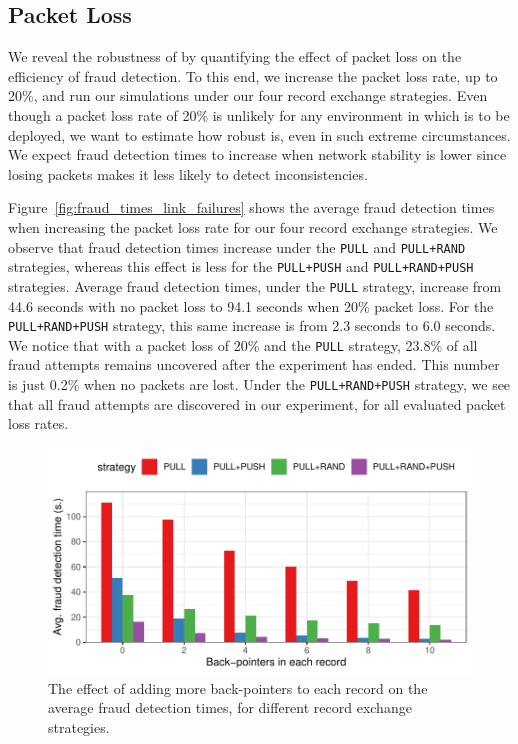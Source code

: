 \subsection{Packet Loss}
We reveal the robustness of \TrustChain{} by quantifying the effect of packet loss on the efficiency of fraud detection.
To this end, we increase the packet loss rate, up to 20\%, and run our simulations under our four record exchange strategies.
Even though a packet loss rate of 20\% is unlikely for any environment in which \TrustChain{} is to be deployed, we want to estimate how robust \TrustChain{} is, even in such extreme circumstances.
We expect fraud detection times to increase when network stability is lower since losing packets makes it less likely to detect inconsistencies.

Figure~\ref{fig:fraud_times_link_failures} shows the average fraud detection times when increasing the packet loss rate for our four record exchange strategies.
We observe that fraud detection times increase under the \texttt{PULL} and \texttt{PULL+RAND} strategies, whereas this effect is less for the \texttt{PULL+PUSH} and \texttt{PULL+RAND+PUSH} strategies.
Average fraud detection times, under the \texttt{PULL} strategy, increase from 44.6 seconds with no packet loss to 94.1 seconds when 20\% packet loss.
For the \texttt{PULL+RAND+PUSH} strategy, this same increase is from 2.3 seconds to 6.0 seconds.
We notice that with a packet loss of 20\% and the \texttt{PULL} strategy, 23.8\% of all fraud attempts remains uncovered after the experiment has ended.
This number is just 0.2\% when no packets are lost.
Under the \texttt{PULL+RAND+PUSH} strategy, we see that all fraud attempts are discovered in our experiment, for all evaluated packet loss rates.

\begin{figure}[t]
	\centering
	\includegraphics[width=.9\linewidth]{trustchain/assets/fraud_times_back_pointers}
	\caption{The effect of adding more back-pointers to each record on the average fraud detection times, for different record exchange strategies.}
	\label{fig:fraud_times_back_pointers}
\end{figure}

